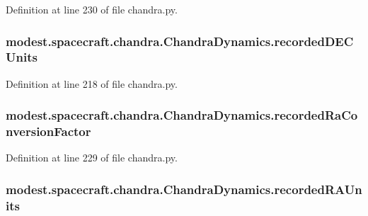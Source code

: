 Definition at line 230 of file chandra.\+py.

\subsubsection[{\texorpdfstring{recorded\+D\+E\+C\+Units}{recordedDECUnits}}]{\setlength{\rightskip}{0pt plus 5cm}modest.\+spacecraft.\+chandra.\+Chandra\+Dynamics.\+recorded\+D\+E\+C\+Units}\hypertarget{classmodest_1_1spacecraft_1_1chandra_1_1ChandraDynamics_af4ded860f3473bcf94a104e5a99c3c15}{}\label{classmodest_1_1spacecraft_1_1chandra_1_1ChandraDynamics_af4ded860f3473bcf94a104e5a99c3c15}


Definition at line 218 of file chandra.\+py.

\subsubsection[{\texorpdfstring{recorded\+Ra\+Conversion\+Factor}{recordedRaConversionFactor}}]{\setlength{\rightskip}{0pt plus 5cm}modest.\+spacecraft.\+chandra.\+Chandra\+Dynamics.\+recorded\+Ra\+Conversion\+Factor}\hypertarget{classmodest_1_1spacecraft_1_1chandra_1_1ChandraDynamics_aba11edaafb844edad6e00a63dc81efe5}{}\label{classmodest_1_1spacecraft_1_1chandra_1_1ChandraDynamics_aba11edaafb844edad6e00a63dc81efe5}


Definition at line 229 of file chandra.\+py.

\subsubsection[{\texorpdfstring{recorded\+R\+A\+Units}{recordedRAUnits}}]{\setlength{\rightskip}{0pt plus 5cm}modest.\+spacecraft.\+chandra.\+Chandra\+Dynamics.\+recorded\+R\+A\+Units}\hypertarget{classmodest_1_1spacecraft_1_1chandra_1_1ChandraDynamics_a125e53edd0dd24e5a982947bf5053913}{}\label{classmodest_1_1spacecraft_1_1chandra_1_1ChandraDynamics_a125e53edd0dd24e5a982947bf5053913}


